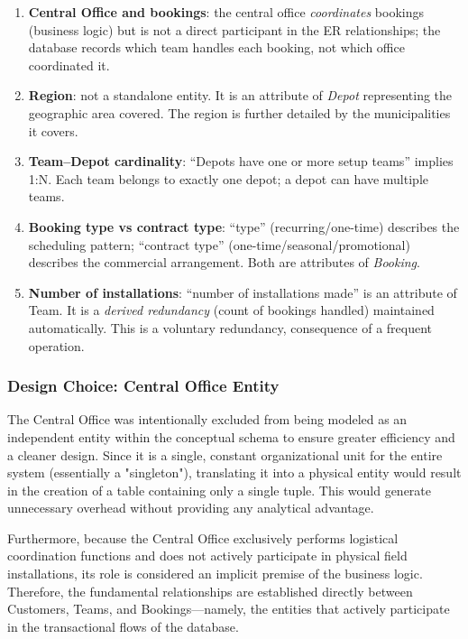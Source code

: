 \documentclass[12pt]{article}
\begin{document}
\begin{enumerate}
  \item \textbf{Central Office and bookings}: the central office \emph{coordinates} bookings (business
        logic) but is not a direct participant in the ER relationships; the database records which team
        handles each booking, not which office coordinated it.
  \item \textbf{Region}: not a standalone entity. It is an attribute of \textit{Depot} representing
        the geographic area covered. The region is further detailed by the municipalities it covers.
  \item \textbf{Team--Depot cardinality}: ``Depots have one or more setup teams'' implies 1:N.
        Each team belongs to exactly one depot; a depot can have multiple teams.
  \item \textbf{Booking type vs contract type}: ``type'' (recurring/one-time) describes the
        scheduling pattern; ``contract type'' (one-time/seasonal/promotional) describes the commercial
        arrangement. Both are attributes of \textit{Booking}.
  \item \textbf{Number of installations}: ``number of installations made'' is an attribute of Team.
        It is a \emph{derived redundancy} (count of bookings handled) maintained automatically. 
        This is a voluntary redundancy, consequence of a frequent operation. 
\end{enumerate}

\subsubsection{Design Choice: Central Office Entity}

The Central Office was intentionally excluded from being modeled as an independent entity within the conceptual schema to ensure greater
 efficiency and a cleaner design. Since it is a single, constant organizational unit for the entire system (essentially a "singleton"), 
 translating it into a physical entity would result in the creation of a table containing only a single tuple. This would generate unnecessary 
 overhead without providing any analytical advantage.

Furthermore, because the Central Office exclusively performs logistical coordination functions and does not actively participate in physical 
field installations, its role is considered an implicit premise of the business logic. Therefore, the fundamental relationships are established 
directly between Customers, Teams, and Bookings—namely, the entities that actively participate in the transactional flows of the database.
\pagebreak
\end{document}
